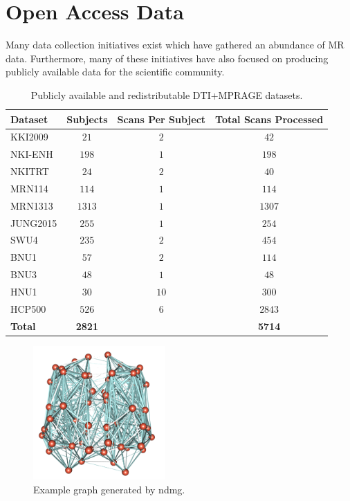\section{Open Access Data}
\label{sec:opendata}
Many data collection initiatives exist which have gathered an abundance of MR data. Furthermore, many of these initiatives have also focused on producing publicly available data for the scientific community.
\begin{table}[h!]
\centering
\begin{tabular}{| l | c | c | c |}
\hline
\textbf{Dataset}	& \textbf{Subjects} & \textbf{Scans Per Subject} & \textbf{Total Scans Processed} \\ \hline \hline
KKI2009 & $21$ & $2$ & $42$ \\ \hline
NKI-ENH & $198$ & $1$ & $198$\\ \hline
NKITRT & $24$ & $2$ & $40$\\ \hline
MRN114 & $114$ & $1$ & $114$\\ \hline
MRN1313 & $1313$ & $1$ & $1307$\\ \hline
JUNG2015 & $255$ & $1$ & $254$\\ \hline
SWU4 & $235$ & $2$ & $454$ \\ \hline
BNU1 & $57$ & $2$ & $114$\\ \hline
BNU3 & $48$ & $1$ & $48$\\ \hline
HNU1 & $30$ & $10$ & $300$\\ \hline
HCP500 & $526$ & $6$ & $2843$\\ \hline
\textbf{Total} & \textbf{2821} &  & \textbf{5714}\\ \hline
\end{tabular}
\makeatletter
\let\@currsize\normalsize
    \caption{Publicly available and redistributable DTI+MPRAGE datasets.}
   	\label{tab:data}
\end{table}
\begin{figure}[h!]
\centering
\includegraphics[width=0.45\textwidth]{./figs/graph.png}
\makeatletter
\let\@currsize\normalsize
\caption{Example graph generated by ndmg.}
\label{fig:3dgraph}
\end{figure}

